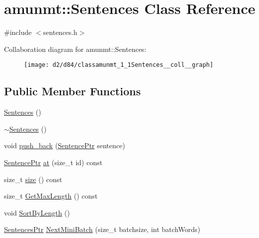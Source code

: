 \hypertarget{classamunmt_1_1Sentences}{}\section{amunmt\+:\+:Sentences Class Reference}
\label{classamunmt_1_1Sentences}


{\ttfamily \#include $<$sentences.\+h$>$}



Collaboration diagram for amunmt\+:\+:Sentences\+:
\nopagebreak
\begin{figure}[H]
\begin{center}
\leavevmode
\texttt{[image: d2/d84/classamunmt\_1\_1Sentences\_\_coll\_\_graph]}
\end{center}
\end{figure}
\subsection*{Public Member Functions}
\begin{DoxyCompactItemize}
\item 
\hyperlink{classamunmt_1_1Sentences_ae8e09eee2812b30969440999118b84d4}{Sentences} ()
\item 
\hyperlink{classamunmt_1_1Sentences_a2cd447b9da2c51aa1534d76937f04792}{$\sim$\+Sentences} ()
\item 
void \hyperlink{classamunmt_1_1Sentences_a65e915e68559978f479af22b1173f3c6}{push\+\_\+back} (\hyperlink{namespaceamunmt_a79f0566b0c1ac270d350b2912a3be4a4}{Sentence\+Ptr} sentence)
\item 
\hyperlink{namespaceamunmt_a79f0566b0c1ac270d350b2912a3be4a4}{Sentence\+Ptr} \hyperlink{classamunmt_1_1Sentences_afe33dd6de1f3dfbcff4003c32bdd1f4b}{at} (size\+\_\+t id) const 
\item 
size\+\_\+t \hyperlink{classamunmt_1_1Sentences_accf70916436eb80cd7f4df9645fd1da8}{size} () const 
\item 
size\+\_\+t \hyperlink{classamunmt_1_1Sentences_a02f0688d10222abd36ef037121a85e72}{Get\+Max\+Length} () const 
\item 
void \hyperlink{classamunmt_1_1Sentences_ada175aa31a779a503afec2441efac300}{Sort\+By\+Length} ()
\item 
\hyperlink{namespaceamunmt_a06c5762b84aba68e6c69fb409e57829e}{Sentences\+Ptr} \hyperlink{classamunmt_1_1Sentences_ada8019dbcd4db342747d425044468b5e}{Next\+Mini\+Batch} (size\+\_\+t batchsize, int batch\+Words)
\end{DoxyCompactItemize}
